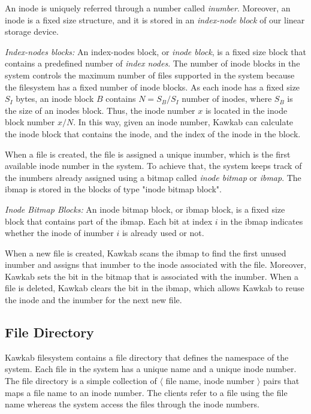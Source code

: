 \documentclass[]{article}
\newcommand{\subtopic}[1]{\vspace{1.5pt} \noindent \textit{#1}}
\begin{document}
An inode is uniquely referred through a number called \textit{inumber}.
Moreover, an inode is a fixed size structure, and it is stored in an
\textit{index-node block} of our linear storage device.

\subtopic{Index-nodes blocks:} An index-nodes block, or \textit{inode block},
is a fixed size block that contains a predefined number of \textit{index
nodes}.  The number of inode blocks in the system controls the maximum number
of files supported  in the system because the filesystem has a fixed number of
inode blocks.
As each inode has a fixed size $S_I$ bytes, an inode block $B$ contains $N =
S_{B} / S_I$ number of inodes, where $S_B$ is the size of an inodes block.
Thus, the inode number $x$ is located in the inode block number $ x / N$. In
this way, given an inode number, Kawkab can calculate the inode block that
contains the inode, and the index of the inode in the block.

When a file is created, the file is assigned a unique inumber, which
is the first available inode number in the system. To achieve that, the
system keeps track of the inumbers already assigned using a bitmap
called \textit{inode bitmap} or \textit{ibmap}. The ibmap is stored in
the blocks of type "inode bitmap block".


\subtopic{Inode Bitmap Blocks:} An inode bitmap block, or ibmap block,
is a fixed size block that contains part of the ibmap. 
Each bit at index $i$ in the ibmap indicates whether the inode of inumber $i$ 
is already used or not. 

When a new file is created, Kawkab scans the ibmap to find the first unused 
inumber and assigns that inumber to the inode associated with the file. Moreover,
Kawkab sets the bit in the bitmap that is associated with the inumber.
When a file is deleted, Kawkab clears the bit in the ibmap, which allows
Kawkab to reuse the inode and the inumber for the next new file.


\subsection{File Directory} Kawkab filesystem contains a file directory that
defines the namespace of the system.
Each file in the system has a unique name and a unique inode number.  The file
directory is a simple collection of $\langle$ file name, inode number $\rangle$
pairs that maps a file name to an inode number.  The clients refer to a file
using the file name whereas the system access the files through the inode
numbers. 
\end{document}
